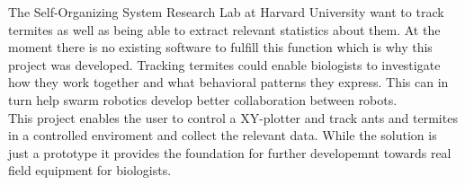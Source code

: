 


The Self-Organizing System Research Lab at Harvard University want to track termites as well as being able to extract relevant statistics about them. At the moment there is no existing software to fulfill this function which is why this project was developed. Tracking termites could enable biologists to investigate how they work together and what behavioral patterns they express. This can in turn help swarm robotics develop better collaboration between robots. \\

This project enables the user to control a XY-plotter and track ants and termites in a controlled enviroment and collect the relevant data. While the solution is just a prototype it provides the foundation for further developemnt towards real field equipment for biologists. 